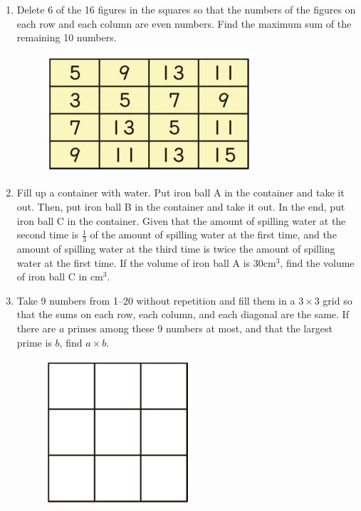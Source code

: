 \documentclass[12pt]{scrartcl}
\begin{document}
\begin{enumerate}[resume]
\hrulefill \item Delete 6 of the 16 figures in the squares so that the numbers of the figures on each row and each column are even numbers. Find the maximum sum of the remaining 10 numbers.
    \begin{figure}[h]
        \centering
        \includegraphics[scale=0.7]{StarGen/0Figure/wmi-2020-5b-6.png}
    \end{figure}

\hrulefill \item Fill up a container with water. Put iron ball A in the container and take it out. Then, put iron ball B in the container and take it out. In the end, put iron ball C in the container. Given that the amount of spilling water at the second time is $\frac{1}{3}$ of the amount of spilling water at the first time, and the amount of spilling water at the third time is twice the amount of spilling water at the first time. If the volume of iron ball A is 30cm$^3$, find the volume of iron ball C in cm$^3$.

\hrulefill \item Take 9 numbers from 1--20 without repetition and fill them in a $3 \times 3$ grid so that the sums on each row, each column, and each diagonal are the same. If there are $a$ primes among these 9 numbers at most, and that the largest prime is $b$, find $a \times b$.
    \begin{figure}[h]
        \centering
        \includegraphics[scale=0.5]{StarGen/0Figure/wmi-2020-5b-8.png}
    \end{figure}


\end{enumerate}
\end{document}
